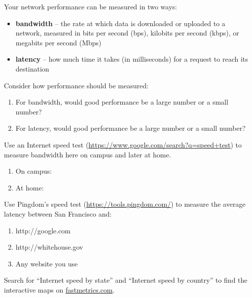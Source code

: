 
Your network performance can be measured in two ways:

\begin{itemize}[itemsep=0pt]
\item \textbf{bandwidth} -- the rate at which data is downloaded or uploaded to a network, measured in bits per second (bps), kilobits per second (kbps), or megabits per second (Mbps)
\item \textbf{latency} -- how much time it takes (in milliseconds) for a request to reach its destination
\end{itemize}




\Q Consider how performance should be measured:
\begin{enumerate}
\item For bandwidth, would good performance be a large number or a small number?
\item For latency, would good performance be a large number or a small number?
\end{enumerate}


\Q Use an Internet speed test (\url{https://www.google.com/search?q=speed+test}) to measure bandwidth here on campus and later at home.

\begin{multicols}{2}
\begin{enumerate}
\item On campus: 
\item At home:   
\end{enumerate}
\end{multicols}


\Q Use Pingdom's speed test (\url{https://tools.pingdom.com/}) to measure the average latency between San Francisco and:
\begin{enumerate}
\item http://google.com     
\item http://whitehouse.gov 
\item Any website you use   
\end{enumerate}


\Q Search for ``Internet speed by state'' and ``Internet speed by country'' to find the interactive maps on \href{https://www.fastmetrics.com/sitemap.php}{fastmetrics.com}.

